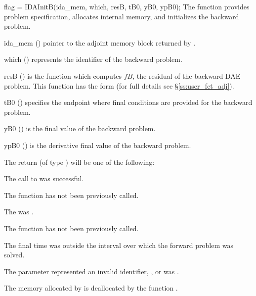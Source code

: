 {
  flag = IDAInitB(ida\_mem, which, resB, tB0, yB0, ypB0);
}
{
  The function  provides problem specification, allocates internal memory, 
  and initializes the backward problem.
}
{
  \begin{args}
  \item[ida\_mem] ()
    pointer to the adjoint memory block returned by .
  \item[which] ()
    represents the identifier of the backward problem.
  \item[resB] ()
    is the {\C} function which computes $fB$, the residual of the 
    backward DAE problem. This function has the form 
     (for full details see \S\ref{ss:user_fct_adj}).
  \item[tB0] ()
    specifies the endpoint where final conditions are provided for the 
    backward problem.
  \item[yB0] ()
    is the final value of the backward problem. 
  \item[ypB0] ()
    is the derivative final value of the backward problem. 
  \end{args}
}
{
  The return  (of type ) will be one of the following:
  \begin{args}
  \item[\Id{IDA\_SUCCESS}]
    The call to  was successful.
  \item[\Id{IDA\_NO\_MALLOC}]
    The function  has not been previously called.
  \item[\Id{IDA\_MEM\_NULL}]
    The  was .
  \item[\Id{IDA\_NO\_ADJ}]
    The function  has not been previously called.
  \item[\Id{IDA\_BAD\_TB0}]
    The final time  was outside the interval over which the forward problem
    was solved.
  \item[\Id{IDA\_ILL\_INPUT}]
    The parameter  represented an invalid identifier, ,  or 
     was .
  \end{args}
}
{
  The memory allocated by  is deallocated by the function 
  .
  
}

